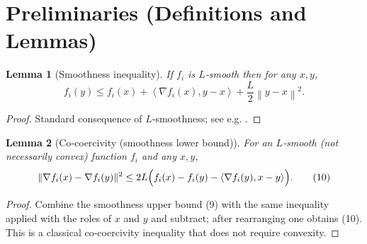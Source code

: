 \documentclass{article}
\newtheorem{lemma}{Lemma}
\newcommand{\norm}[1]{\left\|#1\right\|}
\newcommand{\inner}[2]{\left\langle #1,#2\right\rangle}
\begin{document}
\section*{Preliminaries (Definitions and Lemmas)}
\begin{lemma}[Smoothness inequality]\label{lem:smooth}
If $f_i$ is $L$‑smooth then for any $x,y$,
\[
f_i(y)\le f_i(x)+\inner{\nabla f_i(x)}{y-x}+\frac{L}{2}\norm{y-x}^{2}.
\tag{9}
\]
\end{lemma}
\begin{proof}
Standard consequence of $L$‑smoothness; see e.g. \cite{Nesterov2004}.
\end{proof}

\begin{lemma}[Co‑coercivity (smoothness lower bound)]\label{lem:coerc}
For an $L$‑smooth (not necessarily convex) function $f_i$ and any $x,y$,
\[
\|\nabla f_i(x)-\nabla f_i(y)\|^{2}
\le 2L\Bigl(f_i(x)-f_i(y)-\inner{\nabla f_i(y)}{x-y}\Bigr).
\tag{10}
\]
\end{lemma}
\begin{proof}
Combine the smoothness upper bound (9) with the same inequality applied with the roles of $x$ and $y$ and subtract; after rearranging one obtains (10). This is a classical co‑coercivity inequality that does not require convexity.
\end{proof}
\end{document}
